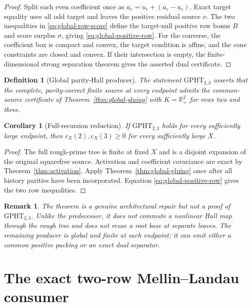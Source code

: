 \documentclass[11pt]{article}
\newtheorem{corollary}[theorem]{Corollary}
\newtheorem{definition}[theorem]{Definition}
\newtheorem{remark}[theorem]{Remark}
\newcommand{\R}{\mathbb R}
\newcommand{\1}{\mathbf 1}
\newcommand{\GPHT}{\mathrm{GPHT}_{2,3}}
\begin{document}
\begin{proof}
Split each even coefficient once as $a_e=u_e+(a_e-u_e)$.  Exact target equality
uses all odd target and leaves the positive residual source $\nu$.  The two
inequalities in \eqref{eq:global-row-score} define the target-null positive row
bonus $B$ and score surplus $\sigma$, giving
\eqref{eq:global-positive-row}.  For the converse, the coefficient box is
compact and convex, the target condition is affine, and the cone constraints
are closed and convex.  If their intersection is empty, the finite-dimensional
strong separation theorem gives the asserted dual certificate.
\end{proof}

\begin{definition}[Global parity-Hall producer]
The statement $\GPHT$ asserts that the complete, parity-correct finite source at
every endpoint admits the common-source certificate of
Theorem~\ref{thm:global-gluing} with $K=\R_+^2$ for rows two and three.
\end{definition}

\begin{corollary}[Full-recursion reduction]
\label{cor:GPHT-rows}
If $\GPHT$ holds for every sufficiently large endpoint, then
$c_X(2),c_X(3)\ge0$ for every sufficiently large $X$.
\end{corollary}

\begin{proof}
The full rough-prime tree is finite at fixed $X$ and is a disjoint expansion of
the original squarefree source.  Activation and coefficient covariance are
exact by Theorem~\ref{thm:activation}.  Apply
Theorem~\ref{thm:global-gluing} once after all history parities have been
incorporated.  Equation \eqref{eq:global-positive-row} gives the two row
inequalities.
\end{proof}

\begin{remark}
The theorem is a genuine architectural repair but not a proof of $\GPHT$.
Unlike the predecessor, it does not commute a nonlinear Hall map through the
rough tree and does not reuse a root base at separate leaves.  The remaining
producer is global and finite at each endpoint; it can emit either a common
positive packing or an exact dual separator.
\end{remark}


\section{The exact two-row Mellin--Landau consumer}
\end{document}
